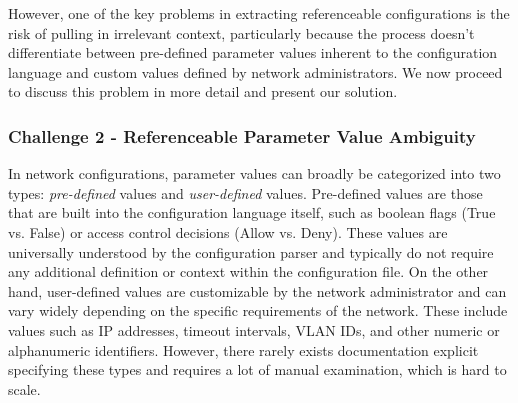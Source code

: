 
However, one of the key problems in extracting referenceable configurations is the risk of pulling in irrelevant context, particularly because the process doesn't differentiate between pre-defined parameter values inherent to the configuration language and custom values defined by network administrators. 
We now proceed to discuss this problem in more detail and present our solution.

\subsubsection{Challenge 2 - Referenceable Parameter Value Ambiguity}

In network configurations, parameter values can broadly be categorized into two types: \textit{pre-defined} values and \textit{user-defined} values. Pre-defined values are those that are built into the configuration language itself, such as boolean flags (True vs. False) or access control decisions (Allow vs. Deny). These values are universally understood by the configuration parser and typically do not require any additional definition or context within the configuration file. On the other hand, user-defined values are customizable by the network administrator and can vary widely depending on the specific requirements of the network. These include values such as IP addresses, timeout intervals, VLAN IDs, and other numeric or alphanumeric identifiers. However, there rarely exists documentation explicit specifying these types and requires a lot of manual examination, which is hard to scale.

